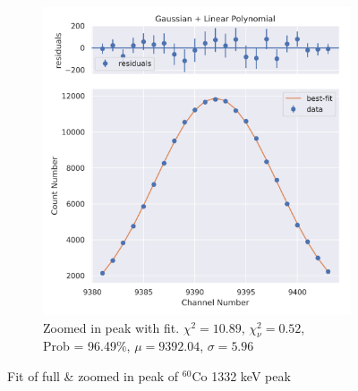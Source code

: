 \documentclass[11pt,a4paper]{article}
\newcommand{\element}[2]{$^{#2}\textrm{#1}$}
\begin{document}
\begin{figure}[H]
\begin{subfigure}{.5\linewidth}
    \includegraphics[width=\linewidth]{./Images/Cobalt60/Linear/Linear_2_Zoom.png}
    \caption{Zoomed in peak with fit. $\chi^2 = 10.89$, $\chi^2_\nu = 0.52$, \\ Prob = 96.49\%, $\mu = 9392.04$, $\sigma = 5.96$}
  \end{subfigure}
  \caption{Fit of full \& zoomed in peak of \element{Co}{60} 1332 keV peak}
\end{figure}
\clearpage
\end{document}
